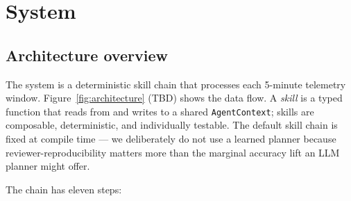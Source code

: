 \section{System}
\label{sec:system}

\subsection{Architecture overview}

The system is a deterministic skill chain that processes each 5-minute telemetry window. Figure~\ref{fig:architecture} (TBD) shows the data flow. A \emph{skill} is a typed function that reads from and writes to a shared \texttt{AgentContext}; skills are composable, deterministic, and individually testable. The default skill chain is fixed at compile time --- we deliberately do not use a learned planner because reviewer-reproducibility matters more than the marginal accuracy lift an LLM planner might offer.

The chain has eleven steps:

